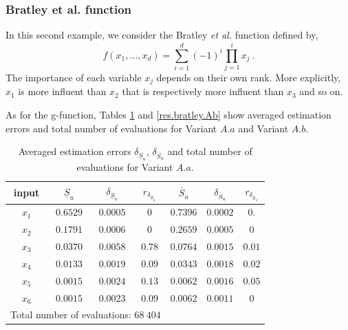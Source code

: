 \subsubsection{Bratley et al. function}

In this second example, we consider the Bratley \textit{et al.} function defined by,
$$f(x_1,\dots,x_d)=\sum \limits_{i=1}^{d} (-1)^i \prod \limits_{j=1}^{i} x_j \ .$$
The importance of each variable $x_j$ depends on their own rank. More explicitly, $x_1$ is more influent than $x_2$ that is respectively more influent than $x_3$ and so on. 

As for the g-function, Tables \ref{res.bratley.Aa} and \ref{res.bratley.Ab} show averaged estimation errors and total number of evaluations for Variant $A.a$ and Variant $A.b$.
\begin{table}[!ht]
\caption{Averaged estimation errors $\delta_{\underline{S}_u}$, $\delta_{\overline{S}_u}$ and total number of evaluations for Variant $A.a$.}
\centering
\begin{tabular}{ccccccc}
\hline
 input & $\underline{S}_u$ & $\delta_{\underline{S}_u}$ & $r_{\delta_{\underline{S}_u}}$ & $\overline{S}_u$ & $\delta_{\overline{S}_u}$ &$r_{\delta_{\overline{S}_u}}$ \\ \hline
 $x_1$ & $0.6529$ &  $0.0005$ & $0$ & $0.7396$ & $0.0002$ & $0.$ \\ \hline
 $x_2$ & $0.1791$ &  $0.0006$ & $0$ & $0.2659$ & $0.0005$ & $0$ \\ \hline
 $x_3$ & $0.0370$ &  $0.0058$ & $0.78$ & $0.0764$ & $0.0015$ & $0.01$ \\ \hline
 $x_4$ & $0.0133$ &  $0.0019$ & $0.09$ & $0.0343$ & $0.0018$ & $0.02$ \\ \hline
 $x_5$ & $0.0015$ &  $0.0024$ & $0.13$ & $0.0062$ & $0.0016$ & $0.05$ \\ \hline
 $x_6$ & $0.0015$ & $0.0023$ & $0.09$  & $0.0062$ & $0.0011$ & $0$ \\ \hline \hline
\multicolumn{4}{l}{Total number of evaluations: $68 \ 404$} & & &\\ \hline 
\end{tabular}
\label{res.bratley.Aa}
\end{table}
